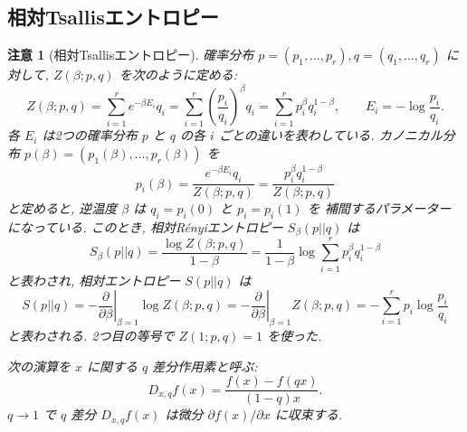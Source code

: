 \documentclass[12pt,twoside]{jarticle}
\renewcommand\d{\partial}
\theoremstyle{jplain}
\theoremstyle{jplain}
\theoremstyle{jplain}
\newtheorem{remark}[theorem]{注意}
\numberwithin{theorem}{section}
\numberwithin{equation}{section}
\numberwithin{figure}{section}
\numberwithin{table}{section}
\begin{document}

\subsection{相対Tsallisエントロピー}
\label{sec:Tsallis}

\begin{remark}[相対Tsallisエントロピー]
\label{remark:Tsallis}
確率分布 $p=(p_1,\ldots,p_r),q=(q_1,\ldots,q_r)$ に対して, 
$Z(\beta;p,q)$ を次のように定める:
\[
Z(\beta;p,q) 
= \sum_{i=1}^r e^{-\beta E_i} q_i
= \sum_{i=1}^r \left(\frac{p_i}{q_i}\right)^\beta q_i
= \sum_{i=1}^r p_i^\beta q_i^{1-\beta},
\qquad
E_i = -\log\frac{p_i}{q_i}.
\]
各 $E_i$ は2つの確率分布 $p$ と $q$ の各 $i$ ごとの違いを表わしている.
カノニカル分布 $p(\beta)=(p_1(\beta),\ldots,p_r(\beta))$ を
\[
p_i(\beta)
=\frac{e^{-\beta E_i}q_i}{Z(\beta;p,q)}
=\frac{p_i^\beta q_i^{1-\beta}}{Z(\beta;p,q)}
\]
と定めると, 逆温度 $\beta$ は $q_i=p_i(0)$ と $p_i=p_i(1)$ を
補間するパラメーターになっている.
このとき, 相対R\'enyiエントロピー $S_\beta(p||q)$ は
\[
S_\beta(p||q)
=\frac{\log Z(\beta;p,q)}{1-\beta}
=\frac{1}{1-\beta}\log\sum_{i=1}^r p_i^\beta q_i^{1-\beta}
\]
と表わされ, 相対エントロピー $S(p||q)$ は 
\[
S(p||q)
=-\left.\frac{\d}{\d\beta}\right|_{\beta=1} \log Z(\beta;p,q) 
=-\left.\frac{\d}{\d\beta}\right|_{\beta=1} Z(\beta;p,q) 
=-\sum_{i=1}^r p_i\log\frac{p_i}{q_i}
\]
と表わされる. 2つ目の等号で $Z(1;p,q)=1$ を使った.

次の演算を $x$ に関する $q$ 差分作用素と呼ぶ:
\[
D_{x,q}f(x) = \frac{f(x)-f(qx)}{(1-q)x}.
\]
$q\to 1$ で $q$ 差分 $D_{x,q}f(x)$ は微分 $\d f(x)/\d x$ に収束する.


\end{remark}
\end{document}
